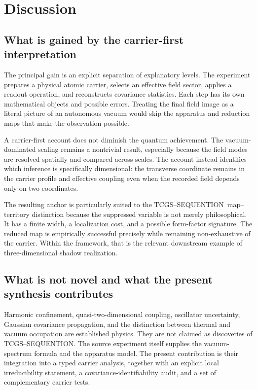 \documentclass[11pt,a4paper]{article}
\theoremstyle{definition}
\theoremstyle{remark}
\newcommand{\TCGS}{TCGS--SEQUENTION}
\begin{document}
\section{Discussion}
\label{sec:discussion}
\subsection{What is gained by the carrier-first interpretation}
The principal gain is an explicit separation of explanatory levels. The experiment prepares a physical atomic carrier, selects an effective field sector, applies a readout operation, and reconstructs covariance statistics. Each step has its own mathematical objects and possible errors. Treating the final field image as a literal picture of an autonomous vacuum would skip the apparatus and reduction maps that make the observation possible.\cite{zhang2026}

A carrier-first account does not diminish the quantum achievement. The vacuum-dominated scaling remains a nontrivial result, especially because the field modes are resolved spatially and compared across scales. The account instead identifies which inference is specifically dimensional: the transverse coordinate remains in the carrier profile and effective coupling even when the recorded field depends only on two coordinates.\cite{zhang2026,hadzibabic}

The resulting anchor is particularly suited to the \TCGS\ map--territory distinction because the suppressed variable is not merely philosophical. It has a finite width, a localization cost, and a possible form-factor signature. The reduced map is empirically successful precisely while remaining non-exhaustive of the carrier. Within the framework, that is the relevant downstream example of three-dimensional shadow realization.\cite{foundation}

\subsection{What is not novel and what the present synthesis contributes}
Harmonic confinement, quasi-two-dimensional coupling, oscillator uncertainty, Gaussian covariance propagation, and the distinction between thermal and vacuum occupation are established physics. They are not claimed as discoveries of \TCGS. The source experiment itself supplies the vacuum-spectrum formula and the apparatus model. The present contribution is their integration into a typed carrier analysis, together with an explicit local irreducibility statement, a covariance-identifiability audit, and a set of complementary carrier tests.\cite{zhang2026,hadzibabic,petrov,weedbrook}
\end{document}
